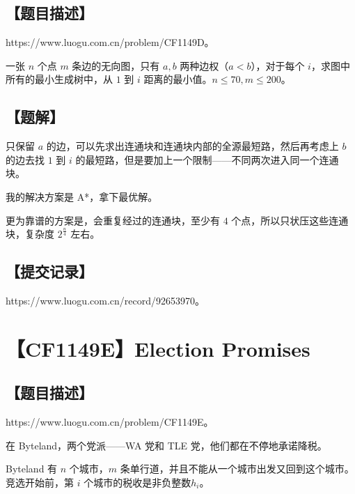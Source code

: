 \documentclass[UTF8,12pt,a4paper]{ctexart}
\begin{document}
	\subsection*{【题目描述】}
	
	https://www.luogu.com.cn/problem/CF1149D。
	
	一张 $n$ 个点 $m$ 条边的无向图，只有 $a,b$ 两种边权（$a<b$），对于每个 $i$，求图中所有的最小生成树中，从 $1$ 到 $i$ 距离的最小值。$n\le 70,m\le 200$。
	
	\subsection*{【题解】}
	
	只保留 $a$ 的边，可以先求出连通块和连通块内部的全源最短路，然后再考虑上 $b$ 的边去找 $1$ 到 $i$ 的最短路，但是要加上一个限制——不同两次进入同一个连通块。
	
	我的解决方案是 A*，拿下最优解。
	
	更为靠谱的方案是，会重复经过的连通块，至少有 $4$ 个点，所以只状压这些连通块，复杂度 $2^{\frac n4}$ 左右。
	
	\subsection*{【提交记录】}
	
	https://www.luogu.com.cn/record/92653970。
	
	
	\section*{【CF1149E】Election Promises}
	
	\subsection*{【题目描述】}
	
	https://www.luogu.com.cn/problem/CF1149E。
	
	在 Byteland，两个党派——WA 党和 TLE 党，他们都在不停地承诺降税。
	
	Byteland 有 $n$ 个城市，$m$ 条单行道，并且不能从一个城市出发又回到这个城市。竞选开始前，第 $i$ 个城市的税收是非负整数$h_i$。
	
\end{document}
